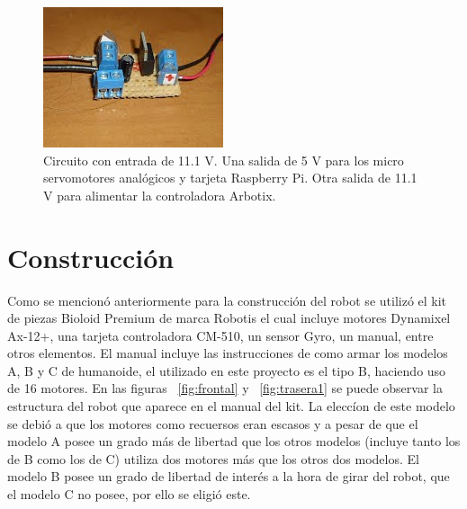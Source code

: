 \begin{figure}[hbtp]
\centering
\includegraphics[scale=0.5]{imagenes/circuito.jpg}
\caption{Circuito con entrada de 11.1 V. Una salida de 5 V para los micro servomotores anal\'ogicos y tarjeta Raspberry Pi. Otra salida de 11.1 V para alimentar la controladora Arbotix.}
\label{fig:circuito}
\end{figure}


\section{Construcción}\label{subsection:construccion}

Como se mencionó anteriormente para la construcción del robot se utilizó el kit de piezas Bioloid Premium de marca Robotis el cual incluye motores Dynamixel Ax-12+, una tarjeta controladora CM-510, un sensor Gyro, un manual, entre otros elementos. El manual incluye las instrucciones de como armar los modelos A, B y C de humanoide, el utilizado en este proyecto es el tipo B, haciendo uso de 16 motores. En las figuras ~\ref{fig:frontal} y ~\ref{fig:trasera1}  se puede observar la estructura del robot que aparece en el manual del kit. La elecc\'ion de este modelo se debi\'o a que los motores como recuersos eran escasos y a pesar de que el modelo A posee un grado más de libertad que los otros modelos (incluye tanto los de B como los de C) utiliza dos motores más que los otros dos modelos. El modelo B posee un grado de libertad de interés a la hora de girar del robot, que el modelo C no posee, por ello se eligi\'o este.

